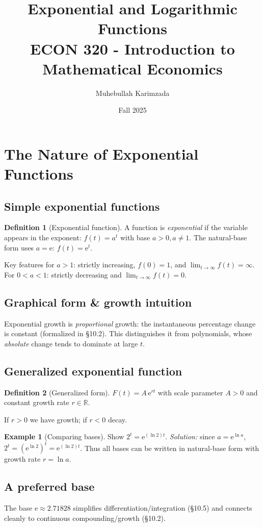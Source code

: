 \documentclass[12pt]{article}
\title{Exponential and Logarithmic Functions\\[7pt]
\large ECON 320 - Introduction to Mathematical Economics}
\author{Muhebullah Karimzada}
\date{Fall 2025}
\newcommand{\R}{\mathbb{R}}
\newcommand{\e}{\mathrm{e}}
\newcommand{\1}{\mathbf{1}}
\theoremstyle{definition}
\newtheorem{definition}{Definition}
\newtheorem{example}{Example}
\theoremstyle{plain}
\begin{document}
\maketitle
\tableofcontents


\newpage
\section{The Nature of Exponential Functions}
\subsection*{Simple exponential functions}
\begin{definition}[Exponential function]
A function is \emph{exponential} if the variable appears in the exponent: \(f(t)=a^t\) with base \(a>0, a\neq 1\). The natural-base form uses \(a=\e\): \(f(t)=\e^{t}\).
\end{definition}

Key features for \(a>1\): strictly increasing, \(f(0)=1\), and \(\lim_{t\to\infty}f(t)=\infty\). For \(0<a<1\): strictly decreasing and \(\lim_{t\to\infty}f(t)=0\).

\subsection*{Graphical form \& growth intuition}
Exponential growth is \emph{proportional} growth: the instantaneous percentage change is constant (formalized in \S10.2). This distinguishes it from polynomials, whose \emph{absolute} change tends to dominate at large \(t\).

\subsection*{Generalized exponential function}
\begin{definition}[Generalized form]
\(F(t)=A\,\e^{rt}\) with scale parameter \(A>0\) and constant growth rate \(r\in\R\).
\end{definition}
If \(r>0\) we have growth; if \(r<0\) decay.

\begin{example}[Comparing bases]
Show \(2^t = \e^{(\ln 2)t}\). \emph{Solution:} since \(a=\e^{\ln a}\), \(2^{t}=(\e^{\ln 2})^{t}=\e^{(\ln 2)t}\). Thus all bases can be written in natural-base form with growth rate \(r=\ln a\).
\end{example}

\subsection*{A preferred base}
The base \(\e\approx 2.71828\) simplifies differentiation/integration (\S10.5) and connects cleanly to continuous compounding/growth (\S10.2).
\end{document}
